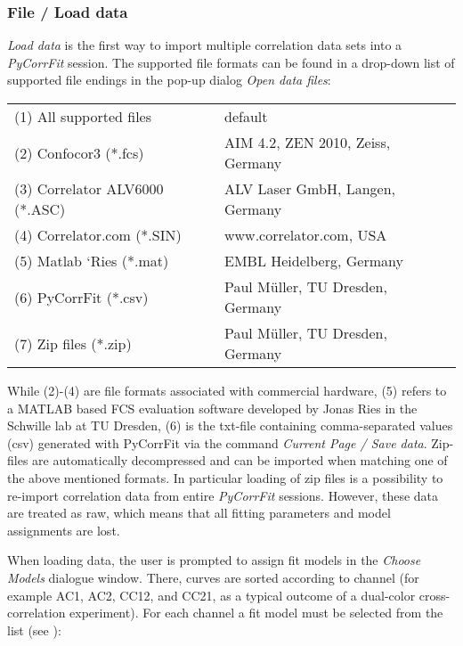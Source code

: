 \subsubsection{File / Load data}
\label{sec:fm.ld}
\textit{Load data }is the first way to import multiple correlation data sets into a \textit{PyCorrFit} session. The supported file formats can be found in a drop-down list of supported file endings in the pop-up dialog \textit{Open data files}:


\begin{tabular}{l l}
 \rule{0pt}{3ex}  (1) All supported files & default \\
 \rule{0pt}{3ex} (2) Confocor3 (*.fcs) & AIM 4.2, ZEN 2010, Zeiss, Germany \\
 \rule{0pt}{3ex} (3) Correlator ALV6000 (*.ASC) & ALV Laser GmbH, Langen, Germany \\
 \rule{0pt}{3ex} (4) Correlator.com (*.SIN) & www.correlator.com, USA \\
 \rule{0pt}{3ex} (5) Matlab ‘Ries (*.mat) & EMBL Heidelberg, Germany \\
 \rule{0pt}{3ex} (6) PyCorrFit (*.csv) & Paul Müller, TU Dresden, Germany \\
 \rule{0pt}{3ex} (7) Zip files (*.zip) & Paul Müller, TU Dresden, Germany \\
\end{tabular}
\vspace{3ex}
\newline
While (2)-(4) are file formats associated with commercial hardware, (5) refers to a MATLAB based FCS evaluation software developed by Jonas Ries in the Schwille lab at TU Dresden, (6) is the txt-file containing comma-separated values (csv) generated with PyCorrFit via the command \textit{Current Page / Save data}. Zip-files are automatically decompressed and can be imported when matching one of the above mentioned formats. In particular loading of zip files is a possibility to re-import correlation data from entire \textit{PyCorrFit} sessions. However, these data are treated as raw, which means that all fitting parameters and model assignments are lost.

When loading data, the user is prompted to assign fit models in the \textit{Choose Models} dialogue window. There, curves are sorted according to channel (for example AC1, AC2, CC12, and CC21, as a typical outcome of a dual-color cross-correlation experiment). For each channel a fit model must be selected from the list (see ):

